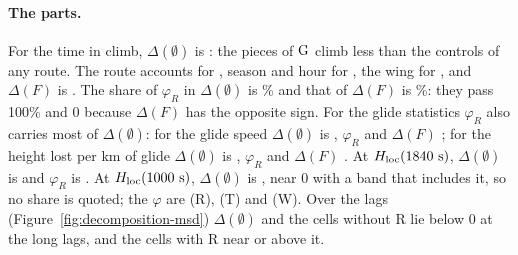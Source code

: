 \begin{table}
\centering\scriptsize
\setlength{\tabcolsep}{3pt}

\caption{Decomposition, level all: value of $\G$ on its \DecPiecesK{} pieces (\DecPiecesQ{} for $\Hq$, \DecPiecesPhase{} for the phase statistics), the raw gap $\G-\Sl$ of Section~\ref{sec:raw},
the controls and $\Delta$ of the cells $\emptyset$ and $F$, and $\varphi_R$, $\varphi_T$, $\varphi_W$. Dataset 1000 ($\Hk$, statistics), 2760 ($\Hq$); average first, ratio after, unit the piece.
The eight cells in Appendix~\ref{app:figures}.}
\label{tab:decomposition}
\end{table}

\paragraph{The parts.} For the time in climb, $\Delta(\emptyset)$ is \DecNoneClimb{} \DecNoneClimbBand: the pieces of $\G$ climb less than the controls of any route. The route accounts for \DecPhiClimbR{} \DecPhiClimbRBand, season and hour for \DecPhiClimbT, the wing for \DecPhiClimbW,
and $\Delta(F)$ is \DecDeltaClimbF{} \DecDeltaClimbFBand. The share of $\varphi_R$ in $\Delta(\emptyset)$ is \DecShareClimbR\% and that of $\Delta(F)$ is \DecShareClimbF\%: they pass 100\% and 0 because $\Delta(F)$ has the opposite sign. For the glide statistics $\varphi_R$ also carries most of $\Delta(\emptyset)$: for the glide speed
$\Delta(\emptyset)$ is \DecNoneGlide, $\varphi_R$ \DecPhiGlideR{} and $\Delta(F)$ \DecDeltaGlideF; for the height lost per km of glide $\Delta(\emptyset)$ is \DecNoneSink, $\varphi_R$ \DecPhiSinkR{} and $\Delta(F)$ \DecDeltaSinkF.
At $\Hq$, $\Delta(\emptyset)$ is \DecNoneHQ{} \DecNoneHQBand{} and $\varphi_R$ is \DecPhiHQR{} \DecPhiHQRBand. At $\Hk$, $\Delta(\emptyset)$ is \DecNoneHK{} \DecNoneHKBand{}, near 0 with a band that includes it, so no share is quoted; the $\varphi$ are
\DecPhiHKR{} \DecPhiHKRBand{} (R), \DecPhiHKT{} (T) and \DecPhiHKW{} \DecPhiHKWBand{} (W). Over the lags (Figure~\ref{fig:decomposition-msd}) $\Delta(\emptyset)$ and the cells without R lie below 0 at the long lags, and the cells with R near or above it.

